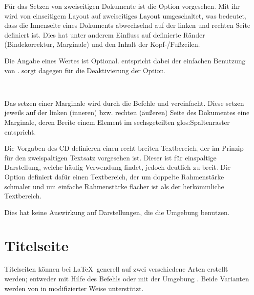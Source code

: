 \begin{Declaration}
\end{Declaration}

Für das Setzen von zweiseitigen Dokumente ist die Option 
vorgesehen. Mit ihr wird von einseitigem Layout auf zweiseitiges Layout
umgeschaltet, was bedeutet, dass die Innenseite eines Dokuments abwechselnd
auf der linken und rechten Seite definiert ist. Dies hat unter anderem Einfluss
auf definierte Ränder (Bindekorrektur, Marginale) und den Inhalt der
Kopf-/Fußzeilen.

Die Angabe eines Wertes ist Optional.  entspricht
dabei der einfachen Benutzung von .
 sorgt dagegen für die Deaktivierung der Option.

\begin{Declaration}
  \\
\end{Declaration}

Das setzen einer Marginale wird durch die Befehle  und
 vereinfacht. Diese setzen jeweils auf der linken (inneren)
bzw. rechten (äußeren) Seite des Dokumentes eine Marginale, deren Breite
einem Element im sechsgeteilten \gls{glos:Spaltenraster} entspricht.

\begin{Declaration}
\end{Declaration}

Die Vorgaben des CD definieren einen recht breiten Textbereich, der im Prinzip
für den zweispaltigen Textsatz vorgesehen ist. Dieser ist für einspaltige
Darstellung, welche häufig Verwendung findet, jedoch deutlich zu breit.
Die Option  definiert dafür einen Textbereich, der um
doppelte Rahmenstärke schmaler und um einfache Rahmenstärke flacher
ist als der herkömmliche Textbereich.
\begin{important}
Dies hat keine Auswirkung auf Darstellungen, die die Umgebung
 benutzen.
\end{important}


\section{Titelseite}\label{sec:titlepage}

Titelseiten können bei \LaTeX\ generell auf zwei verschiedene Arten erstellt
werden; entweder mit Hilfe des Befehls  oder mit
der Umgebung . Beide Varianten werden von \tubslatex
in modifizierter Weise unterstützt.

